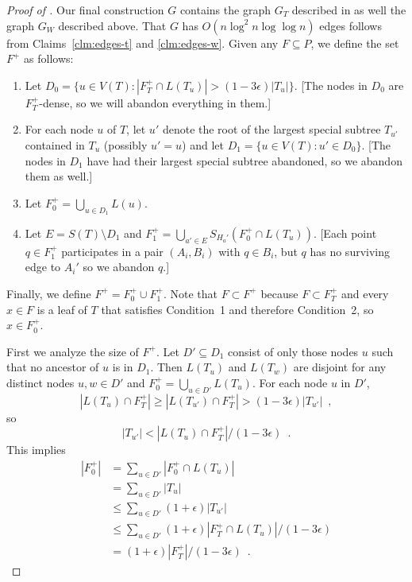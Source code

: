 \documentclass{patmorin}
\begin{document}
\begin{proof}[Proof of ]
  Our final construction $G$ contains the graph $G_T$ described in
   as well the graph $G_W$ described above.  That $G$
  has $O(n\log^2 n\log\log n)$ edges follows from Claims~\ref{clm:edges-t}
  and \ref{clm:edges-w}.  Given any $F\subseteq P$, we define the set $F^+$
  as follows:
  \begin{enumerate}
     \item Let $D_0=\{u\in V(T): |F^+_T\cap L(T_u)|>(1-3\epsilon)|T_u|\}$.
      [The nodes in $D_0$ are $F^+_T$-dense, so we will abandon
       everything in them.]

     \item For each node $u$ of $T$, let $u'$ denote the root of the largest
      special subtree $T_{u'}$ contained in $T_u$ (possibly $u'=u$) and 
      let $D_1=\{u\in V(T): u' \in D_0\}$. 
      [The nodes in $D_1$ have had their largest special subtree abandoned, so we abandon them as well.] 

     \item Let $F^+_0 = \bigcup_{u\in D_1} L(u)$.
     \item Let $E=S(T)\setminus D_1$ and $F_1^+=\bigcup_{a'\in E}
       S_{H_a'}(F^+_0\cap L(T_u))$. [Each point $q\in F^+_1$ participates
       in a pair $(A_i,B_i)$ with $q\in B_i$, but $q$ has no surviving
       edge to $A_i'$ so we abandon $q$.]
  \end{enumerate}
  Finally, we define $F^+=F^+_0\cup F^+_1$.  Note that $F\subset F^+$
  because $F\subset F^+_T$ and every $x\in F$ is a leaf of $T$ that
  satisfies Condition~1 and therefore Condition~2, so $x\in F^+_0$.

  First we analyze the size of $F^+$.  Let $D'\subseteq D_1$ consist of only those nodes $u$
  such that no ancestor of $u$ is in $D_1$.  Then $L(T_u)$ and $L(T_w)$ are
  disjoint for any distinct nodes $u,w\in D'$ and $F^+_0=\bigcup_{u\in
  D'} L(T_u)$.  
  For each node $u$ in $D'$, 
  \[
      |L(T_u)\cap F^+_T| \ge |L(T_{u'})\cap F^+_T| > (1-3\epsilon)|T_{u'}| 
        \enspace ,
  \]
  so
  \[
      |T_{u'}| < |L(T_u)\cap F^+_T|/ (1-3\epsilon) \enspace .
  \]
  This implies
  \begin{align*}
     |F^+_0| & = \sum_{u\in D'} |F^+_0\cap L(T_u)| \\
             & = \sum_{u\in D'} |T_u| \\
             & \le \sum_{u\in D'} (1+\epsilon)|T_{u'}| \\
             & \le \sum_{u\in D'} (1+\epsilon)|F^+_T\cap L(T_u)|/(1-3\epsilon) \\
             & = (1+\epsilon)|F^+_T|/(1-3\epsilon) \enspace .
  \end{align*}


\end{proof}
\end{document}
